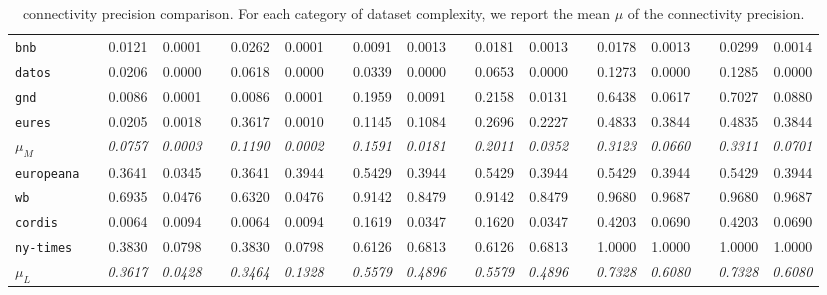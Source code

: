 \begin{table}
{\begin{tabular}{lc@{\hs}rrc@{\hs}rrc@{\hs}rrc@{\hs}rrc@{\hs}rrc@{\hs}rr}
\texttt{bnb} & \phantom{a} & 0.0121 & 0.0001 & \phantom{a} & 0.0262 & 0.0001 & \phantom{a} & 0.0091 & 0.0013  & \phantom{a} & 0.0181 & 0.0013 & \phantom{a} & 0.0178 & 0.0013 & \phantom{a} & 0.0299 & 0.0014 \\
\texttt{datos} & \phantom{a} & 0.0206 & 0.0000 & \phantom{a} & 0.0618 & 0.0000 & \phantom{a} & 0.0339 & 0.0000  & \phantom{a} & 0.0653 & 0.0000 & \phantom{a} & 0.1273 & 0.0000 & \phantom{a} & 0.1285 & 0.0000 \\
\texttt{gnd} & \phantom{a} & 0.0086 & 0.0001 & \phantom{a} & 0.0086 & 0.0001 & \phantom{a} & 0.1959 & 0.0091  & \phantom{a} & 0.2158 & 0.0131 & \phantom{a} & 0.6438 & 0.0617 & \phantom{a} & 0.7027 & 0.0880 \\
\texttt{eures} & \phantom{a} & 0.0205 & 0.0018 & \phantom{a} & 0.3617 & 0.0010 & \phantom{a} & 0.1145 & 0.1084  & \phantom{a} & 0.2696 & 0.2227 & \phantom{a} & 0.4833 & 0.3844 & \phantom{a} & 0.4835 & 0.3844 \\
$\mu_M$ & \phantom{a} & \emph{0.0757} & \emph{0.0003} & \phantom{a} & \emph{0.1190} & \emph{0.0002} & \phantom{a} & \emph{0.1591} & \emph{0.0181} & \phantom{a} & \emph{0.2011} & \emph{0.0352} & \phantom{a} & \emph{0.3123} & \emph{0.0660} & \phantom{a} & \emph{0.3311} & \emph{0.0701} \\
\midrule
\texttt{europeana} & \phantom{a} & 0.3641 & 0.0345 & \phantom{a} & 0.3641 & 0.3944 & \phantom{a} & 0.5429 & 0.3944  & \phantom{a} & 0.5429 & 0.3944 & \phantom{a} & 0.5429 & 0.3944 & \phantom{a} & 0.5429 & 0.3944 \\
\texttt{wb} & \phantom{a} & 0.6935 & 0.0476 & \phantom{a} & 0.6320 & 0.0476 & \phantom{a} & 0.9142 & 0.8479  & \phantom{a} & 0.9142 & 0.8479 & \phantom{a} & 0.9680 & 0.9687 & \phantom{a} & 0.9680 & 0.9687 \\
\texttt{cordis} & \phantom{a} & 0.0064 & 0.0094 & \phantom{a} & 0.0064 & 0.0094 & \phantom{a} & 0.1619 & 0.0347  & \phantom{a} & 0.1620 & 0.0347 & \phantom{a} & 0.4203 & 0.0690 & \phantom{a} & 0.4203 & 0.0690 \\
\texttt{ny-times} & \phantom{a} & 0.3830 & 0.0798 & \phantom{a} & 0.3830 & 0.0798 & \phantom{a} & 0.6126 & 0.6813  & \phantom{a} & 0.6126 & 0.6813 & \phantom{a} & 1.0000 & 1.0000 & \phantom{a} & 1.0000 & 1.0000 \\
$\mu_L$ & \phantom{a} & \emph{0.3617} & \emph{0.0428} & \phantom{a} & \emph{0.3464} & \emph{0.1328} & \phantom{a} & \emph{0.5579} & \emph{0.4896} & \phantom{a} & \emph{0.5579} & \emph{0.4896} & \phantom{a} & \emph{0.7328} & \emph{0.6080} & \phantom{a} & \emph{0.7328} & \emph{0.6080} \\
\bottomrule
\end{tabular}
}
\caption{\Gls{connectivity} precision comparison. For each category of dataset complexity, we report the mean $\mu$ of the connectivity precision.}
\label{tab:precision-conn}
\end{table}
